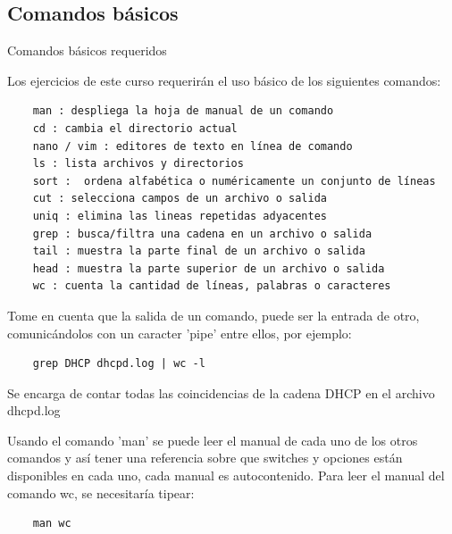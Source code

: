 \subsection{Comandos básicos} %

\begin{frame}{Comandos básicos requeridos} 

    Los ejercicios de este curso requerirán el uso básico de los siguientes
    comandos:

    \begin{verbatim}
    man : despliega la hoja de manual de un comando
    cd : cambia el directorio actual
    nano / vim : editores de texto en línea de comando
    ls : lista archivos y directorios
    sort :  ordena alfabética o numéricamente un conjunto de líneas
    cut : selecciona campos de un archivo o salida
    uniq : elimina las lineas repetidas adyacentes
    grep : busca/filtra una cadena en un archivo o salida
    tail : muestra la parte final de un archivo o salida
    head : muestra la parte superior de un archivo o salida
    wc : cuenta la cantidad de líneas, palabras o caracteres
    \end{verbatim}

    \framebreak

    Tome en cuenta que la salida de un comando, puede ser la entrada de otro,
    comunicándolos con un caracter 'pipe' entre ellos, por ejemplo:

    \begin{verbatim}
    grep DHCP dhcpd.log | wc -l
    \end{verbatim}

    Se encarga de contar todas las coincidencias de la cadena DHCP en el
    archivo dhcpd.log

    Usando el comando 'man' se puede leer el manual de cada uno de los otros
    comandos y así tener una referencia sobre que switches y opciones están
    disponibles en cada uno, cada manual es autocontenido. Para leer el manual
    del comando wc, se necesitaría tipear:

    \begin{verbatim}
    man wc
    \end{verbatim} 

\end{frame}

